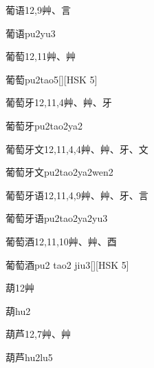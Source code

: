 \begin{Entry}{葡语}{12,9}{⾋、⾔}
  \begin{Phonetics}{葡语}{pu2yu3}
  \end{Phonetics}
\end{Entry}

\begin{Entry}{葡萄}{12,11}{⾋、⾋}
  \begin{Phonetics}{葡萄}{pu2tao5}[][HSK 5]
  \end{Phonetics}
\end{Entry}

\begin{Entry}{葡萄牙}{12,11,4}{⾋、⾋、⽛}
  \begin{Phonetics}{葡萄牙}{pu2tao2ya2}
  \end{Phonetics}
\end{Entry}

\begin{Entry}{葡萄牙文}{12,11,4,4}{⾋、⾋、⽛、⽂}
  \begin{Phonetics}{葡萄牙文}{pu2tao2ya2wen2}
  \end{Phonetics}
\end{Entry}

\begin{Entry}{葡萄牙语}{12,11,4,9}{⾋、⾋、⽛、⾔}
  \begin{Phonetics}{葡萄牙语}{pu2tao2ya2yu3}
  \end{Phonetics}
\end{Entry}

\begin{Entry}{葡萄酒}{12,11,10}{⾋、⾋、⾣}
  \begin{Phonetics}{葡萄酒}{pu2 tao2 jiu3}[][HSK 5]
  \end{Phonetics}
\end{Entry}

\begin{Entry}{葫}{12}{⾋}
  \begin{Phonetics}{葫}{hu2}
  \end{Phonetics}
\end{Entry}

\begin{Entry}{葫芦}{12,7}{⾋、⾋}
  \begin{Phonetics}{葫芦}{hu2lu5}
  \end{Phonetics}
\end{Entry}

